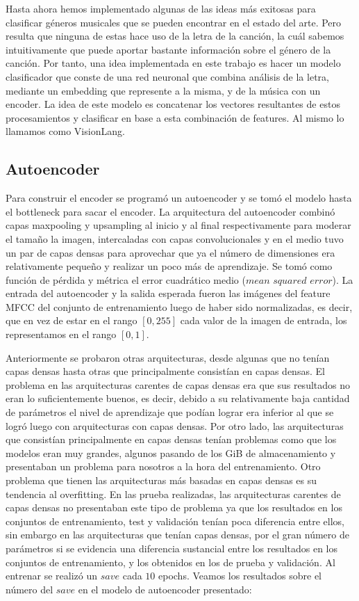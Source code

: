 \documentclass[colorinlistoftodos,twoside,twocolumn,10pt]{article} %
\begin{document}
Hasta ahora hemos implementado algunas de las ideas m\'as exitosas para clasificar g\'eneros musicales que se pueden encontrar en el estado del arte. Pero resulta que ninguna de estas hace uso de la letra de la canci\'on, la cu\'al sabemos intuitivamente que puede aportar bastante informaci\'on sobre el g\'enero de la canci\'on. Por tanto, una idea implementada en este trabajo es hacer un modelo clasificador que conste de una red neuronal que combina análisis de la letra, mediante un embedding que represente a la misma, y de la música con un encoder. La idea de este modelo es concatenar los vectores resultantes de estos procesamientos y clasificar en base a esta combinación de features. Al mismo lo llamamos como VisionLang.

\subsection{Autoencoder}
Para construir el encoder se programó un autoencoder y se tomó el modelo hasta el bottleneck para sacar el encoder. La arquitectura del autoencoder combinó capas maxpooling y upsampling al inicio y al final respectivamente para moderar el tamaño la imagen, intercaladas con capas convolucionales y en el medio tuvo un par de capas densas para aprovechar que ya el número de dimensiones era relativamente pequeño y realizar un poco más de aprendizaje. Se tomó como función de pérdida y métrica el error cuadrático medio ($\textit{mean squared error}$). La entrada del autoencoder y la salida esperada fueron las imágenes del feature MFCC del conjunto de entrenamiento luego de haber sido normalizadas, es decir, que en vez de estar en el rango $[0, 255]$ cada valor de la imagen de entrada, los representamos en el rango $[0, 1]$. 

Anteriormente se probaron otras arquitecturas, desde algunas que no tenían capas densas hasta otras que principalmente consistían en capas densas. El problema en las arquitecturas carentes de capas densas era que sus resultados no eran lo suficientemente buenos, es decir, debido a su relativamente baja cantidad de parámetros el nivel de aprendizaje que podían lograr era inferior al que se logró luego con arquitecturas con capas densas. Por otro lado, las arquitecturas que consistían principalmente en capas densas tenían problemas como que los modelos eran muy grandes, algunos pasando de los GiB de almacenamiento y presentaban un problema para nosotros a la hora del entrenamiento. Otro problema que tienen las arquitecturas más basadas en capas densas es su tendencia al overfitting. En las prueba realizadas, las arquitecturas carentes de capas densas no presentaban este tipo de problema ya que los resultados en los conjuntos de entrenamiento, test y validación tenían poca diferencia entre ellos, sin embargo en las arquitecturas que tenían capas densas, por el gran número de parámetros si se evidencia una diferencia sustancial entre los resultados en los conjuntos de entrenamiento, y los obtenidos en los de prueba y validación. Al entrenar se realizó un $save$ cada $10$ epochs. Veamos los resultados sobre el número del $save$ en el modelo de autoencoder presentado:
\end{document}
